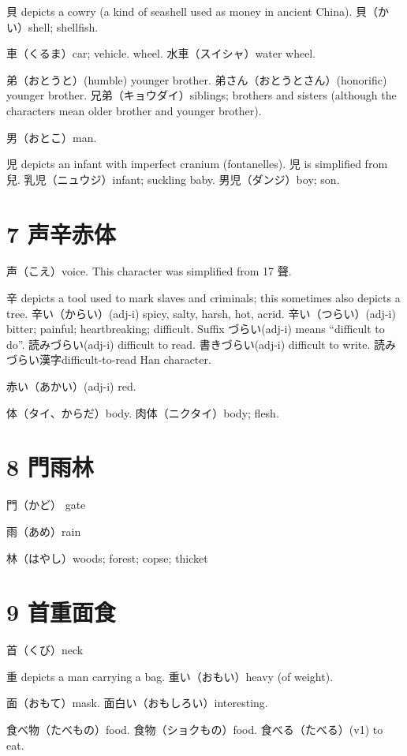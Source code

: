 貝 depicts a cowry (a kind of seashell used as money in ancient China).
貝（かい）shell; shellfish.

車（くるま）car; vehicle. wheel.
水車（スイシャ）water wheel.

弟（おとうと）(humble) younger brother.
弟さん（おとうとさん）(honorific) younger brother.
兄弟（キョウダイ）siblings;
brothers and sisters
(although the characters mean older brother and younger brother).

男（おとこ）man.

児 depicts an infant with imperfect cranium (fontanelles).
児 is simplified from 兒.
乳児（ニュウジ）infant; suckling baby.
男児（ダンジ）boy; son.

\section{7 声辛赤体}

声（こえ）voice.
This character was simplified from 17 聲.

辛 depicts a tool used to mark slaves and criminals;
this sometimes also depicts a tree.
辛い（からい）(adj-i) spicy, salty, harsh, hot, acrid.
辛い（つらい）(adj-i) bitter; painful; heartbreaking; difficult.
Suffix づらい(adj-i) means ``difficult to do''.
読みづらい(adj-i) difficult to read.
書きづらい(adj-i) difficult to write.
読みづらい漢字difficult-to-read Han character.

赤い（あかい）(adj-i) red.

体（タイ、からだ）body.
肉体（ニクタイ）body; flesh.

\section{8 門雨林}

門（かど） gate

雨（あめ）rain

林（はやし）woods; forest; copse; thicket

\section{9 首重面食}

首（くび）neck

重 depicts a man carrying a bag.
重い（おもい）heavy (of weight).

面（おもて）mask.
面白い（おもしろい）interesting.

食べ物（たべもの）food.
食物（ショクもの）food.
食べる（たべる）(v1) to eat.

